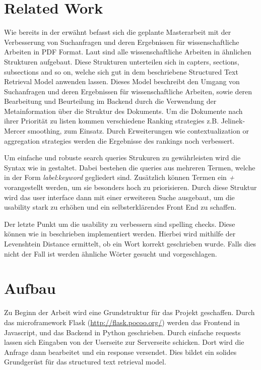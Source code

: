 \documentclass[a4paper, 12pt]{scrartcl}
\begin{document}
\section{Related Work}

Wie bereits in der  erwähnt befasst sich die geplante Masterarbeit mit der Verbesserung von Suchanfragen und deren Ergebnissen für wissenschaftliche Arbeiten in PDF Format. Laut 
\cite{KGJK14} sind alle wissenschaftliche Arbeiten in ähnlichen Strukturen aufgebaut. Diese Strukturen unterteilen sich in capters, sections, subsections and so on, welche sich gut in dem \cite{RNBY99} 
beschriebene Structured Text Retrieval Model anwenden lassen. Dieses Model beschreibt den Umgang von Suchanfragen und deren Ergebnissen für wissenschaftliche Arbeiten, sowie deren Bearbeitung und Beurteilung 
im Backend durch die Verwendung der Metainformation über die Struktur des Dokuments. Um die Dokumente nach ihrer Priorität zu listen kommen verschiedene Ranking strategies z.B. Jelinek-Mercer smoothing, zum 
Einsatz. Durch Erweiterungen wie contextualization or aggregation strategies werden die Ergebnisse des rankings noch verbessert.

Um einfache und robuste search queries Strukuren zu gewährleisten wird die Syntax wie in \cite{Coh03} gestaltet. Dabei bestehen die queries aus mehreren Termen, welche in der Form \textit{label}:\textit{keyword} 
gegliedert sind. Zusätzlich können Termen ein \textit{+} vorangestellt werden, um sie besonders hoch zu priorisieren. Durch diese Struktur wird das user interface dann mit einer erweiteren Suche ausgebaut, um 
die usability stark zu erhöhen und ein selbsterklärendes Front End zu schaffen.

Der letzte Punkt um die usability zu verbessern sind spelling checks. Diese können wie in \cite{SPCB13} beschrieben implementiert werden. Hierbei wird mithilfe der Levenshtein Distance ermittelt, ob ein Wort
korrekt geschrieben wurde. Falls dies nicht der Fall ist werden ähnliche Wörter gesucht und vorgeschlagen. 

\section{Aufbau}

Zu Beginn der Arbeit wird eine Grundstruktur für das Projekt geschaffen. Durch das microframework Flask (\url{http://flask.pocoo.org/}) werden das Frontend in Javascript, und das Backend in Python geschrieben.
Durch einfache requests lassen sich Eingaben von der Userseite zur Serverseite schicken. Dort wird die Anfrage dann bearbeitet und ein response versendet. Dies bildet ein solides Grundgerüst für das 
structured text retrieval model.
\end{document}
